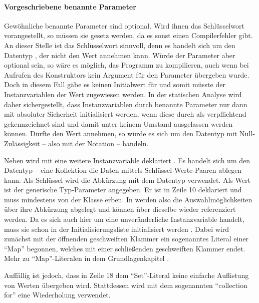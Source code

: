 \paragraph{Vorgeschriebene benannte Parameter}

Gewöhnliche benannte Parameter sind optional.
Wird ihnen das Schlüsselwort  vorangestellt, so müssen sie gesetz werden,
da es sonst einen Compilerfehler gibt.
An dieser Stelle ist das  Schlüsselwort sinnvoll, denn es handelt sich um den Datentyp , der nicht den Wert  annehmen kann.
Würde der Parameter aber optional sein, so wäre es möglich, das Programm zu kompilieren, auch wenn bei Aufrufen des Konstruktors kein Argument für den Parameter übergeben wurde.
Doch in diesem Fall gäbe es keinen Initialwert für  und somit müsste der Instanzvariablen der Wert  zugewiesen werden.
In der statischen Analyse wird daher sichergestellt,
dass Instanzvariablen durch benannte Parameter nur dann mit absoluter Sicherheit initialisiert werden,
wenn diese durch   als verpflichtend gekennzeichnet sind und damit unter keinem Umstand ausgelassen werden können. 
Dürfte  den Wert  annehmen, so würde es sich um den Datentyp  mit Null-Zulässigkeit -- also mit der Notation  -- handeln.

Neben  wird mit  eine weitere Instanzvariable deklariert .
Es handelt sich um den Datentyp  -- eine Kollektion die Daten mittels Schlüssel-Werte-Paaren ablegen kann.
Als Schlüssel wird die Abkürzung mit dem Datentyp  verwendet.
Als Wert ist der generische Typ-Parameter  angegeben.
Er ist in Zeile 10 deklariert und muss mindestens von der Klasse  erben.
In  werden also die Auswahlmöglichkeiten über  ihre Abkürzung abgelegt und können über dieselbe wieder referenziert werden.
 Da es sich auch hier um eine unveränderliche Instanzvariable handelt, muss sie schon in der Initialisierungsliste initialisiert werden .
Dabei wird zunächst mit der öffnenden geschweiften Klammer  ein sogenanntes Literal einer \enquote{Map}  begonnen, welches mit einer schließenden geschweiften Klammer  endet.
Mehr zu \enquote{Map}-Literalen in dem Grundlagenkapitel .



Auffällig ist jedoch, dass in Zeile 18 dem \enquote{Set}-Literal keine einfache Auflistung von Werten übergeben wird.
Stattdessen wird mit dem sogenannten \enquote{collection for} eine Wiederholung verwendet.



